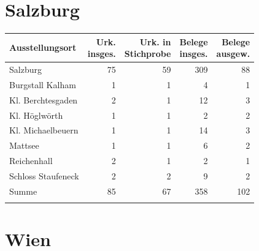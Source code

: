 \section{Salzburg}

\begin{tabularx}{\linewidth}{X r r r r}
\lsptoprule
Ausstellungsort
	& \makecell{Urk.\\ insges.}
	& \makecell{Urk. in\\ Stichprobe}
	& \makecell{Belege\\ insges.}
	& \makecell{Belege\\ ausgew.}
	\\
\midrule

Salzburg
	& 75
	& 59
	& 309
	& 88
	\\

Burgstall Kalham
	& 1
	& 1
	& 4
	& 1
	\\

Kl. Berchtesgaden
	& 2
	& 1
	& 12
	& 3
	\\

Kl. Höglwörth
	& 1
	& 1
	& 2
	& 2
	\\

Kl. Michaelbeuern
	& 1
	& 1
	& 14
	& 3
	\\

Mattsee
	& 1
	& 1
	& 6
	& 2
	\\

Reichenhall
	& 2
	& 1
	& 2
	& 1
	\\

Schloss Staufeneck
	& 2
	& 2
	& 9
	& 2
	\\

\midrule

Summe
	& 85
	& 67
	& 358
	& 102
	\\

\lspbottomrule
\end{tabularx}

\section{Wien}

